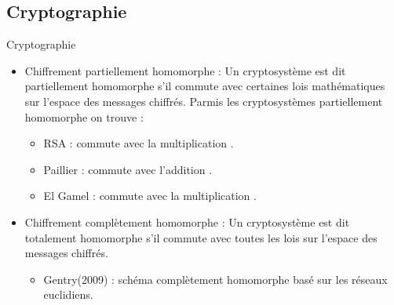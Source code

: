 \documentclass{beamer}
\begin{document}
  \subsection{Cryptographie}
  \begin{frame}{Cryptographie}
    \begin{itemize}
    \item{Chiffrement partiellement homomorphe :\newline
       Un cryptosystème est dit partiellement homomorphe s’il commute avec certaines lois mathématiques sur l’espace des messages chiffrés.
       Parmis les cryptosystèmes partiellement homomorphe on trouve :\newline
       \begin{itemize}
       \item{RSA : commute avec la multiplication .}
       \item{Paillier : commute avec l'addition .}
       \item{El Gamel : commute avec la multiplication .}
   \end{itemize}
      }
      \item{Chiffrement complètement homomorphe :\newline
      Un cryptosystème est dit totalement homomorphe s’il commute avec toutes les lois sur l’espace des messages chiffrés.
      \begin{itemize}
      	\item{Gentry(2009) : schéma complètement homomorphe basé sur les réseaux euclidiens.}
      \end{itemize}
      }
  \end{itemize}


\end{frame}
\end{document}
